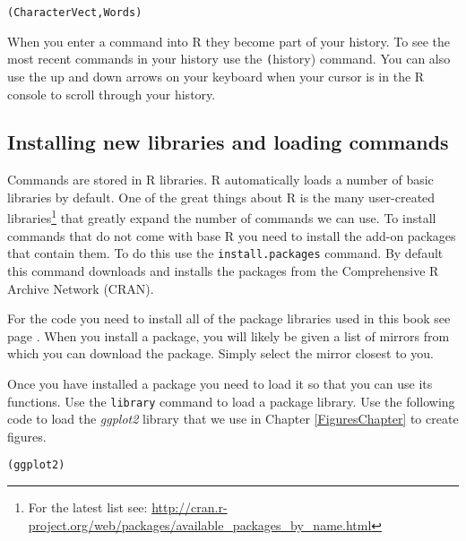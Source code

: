 {\begin{knitrout}
\color{fgcolor}\begin{kframe}
\begin{alltt}
(CharacterVect, Words)
\end{alltt}
\end{kframe}
\end{knitrout}


When you enter a command into R they become part of your history. To see the most recent commands in your history use the \texttt(history) command. You can also use the up and down arrows on your keyboard when your cursor is in the R console to scroll through your history.

\subsection{Installing new libraries and loading commands}\label{Packages}

Commands are stored in R libraries. R automatically loads a number of basic libraries by default. One of the great things about R is the many user-created libraries\footnote{For the latest list see: \url{http://cran.r-project.org/web/packages/available_packages_by_name.html}} that greatly expand the number of commands we can use. To install commands that do not come with base R you need to install the add-on packages\label{packages} that contain them. To do this use the {\tt{install.packages}} command. By default this command downloads and installs the packages from the Comprehensive R Archive Network (CRAN). 

For the code you need to install all of the package libraries used in this book see page \pageref{ReqPackages}. When you install a package, you will likely be given a list of mirrors from which you can download the package. Simply select the mirror closest to you.

Once you have installed a package you need to load it so that you can use its functions. Use the \texttt{library} command to load a package library. Use the following code to load the {\emph{ggplot2}} library that we use in Chapter \ref{FiguresChapter} to create figures.

\begin{knitrout}
\color{fgcolor}\begin{kframe}
\begin{alltt}
(ggplot2)
\end{alltt}
\end{kframe}
\end{knitrout}


}
